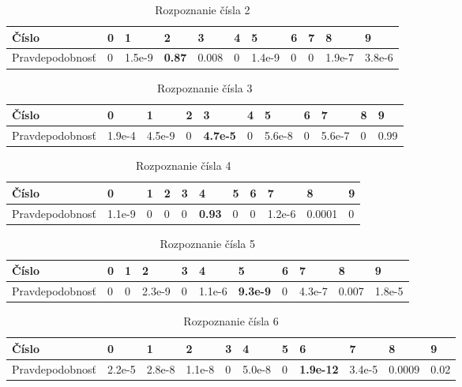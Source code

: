 \begin{table}[H]
  \begin{tabular}{ | l | l | l | l | l | l | l | l | l | l | l |}
    \hline
    Číslo & 0 & 1 & 2 & 3 & 4 & 5 & 6 & 7 & 8 & 9 \\ \hline
    Pravdepodobnosť & 0 & 1.5e-9 & \textbf{0.87} & 0.008 & 0 & 1.4e-9 & 0 & 0 & 1.9e-7 & 3.8e-6 \\
    \hline
  \end{tabular}
  \caption[Rozpoznanie čísla 2]{Rozpoznanie čísla 2}
\end{table}

\begin{table}[H]
  \begin{tabular}{ | l | l | l | l | l | l | l | l | l | l | l |}
    \hline
    Číslo & 0 & 1 & 2 & 3 & 4 & 5 & 6 & 7 & 8 & 9 \\ \hline
    Pravdepodobnosť & 1.9e-4 & 4.5e-9 & 0 & \textbf{4.7e-5} & 0 & 5.6e-8 & 0 & 5.6e-7 & 0 & 0.99 \\
    \hline
  \end{tabular}
  \caption[Rozpoznanie čísla 3]{Rozpoznanie čísla 3}
\end{table}

\begin{table}[H]
  \begin{tabular}{ | l | l | l | l | l | l | l | l | l | l | l |}
    \hline
    Číslo & 0 & 1 & 2 & 3 & 4 & 5 & 6 & 7 & 8 & 9 \\ \hline
    Pravdepodobnosť & 1.1e-9 & 0 & 0 & 0 & \textbf{0.93} & 0 & 0 & 1.2e-6 & 0.0001 & 0 \\
    \hline
  \end{tabular}
  \caption[Rozpoznanie čísla 4]{Rozpoznanie čísla 4}
\end{table}

\begin{table}[H]
  \begin{tabular}{ | l | l | l | l | l | l | l | l | l | l | l |}
    \hline
    Číslo & 0 & 1 & 2 & 3 & 4 & 5 & 6 & 7 & 8 & 9 \\ \hline
    Pravdepodobnosť & 0 & 0 & 2.3e-9 & 0 & 1.1e-6 & \textbf{9.3e-9} & 0 & 4.3e-7 & 0.007 & 1.8e-5 \\
    \hline
  \end{tabular}
  \caption[Rozpoznanie čísla 5]{Rozpoznanie čísla 5}
\end{table}

\begin{table}[H]
  \begin{tabular}{ | l | l | l | l | l | l | l | l | l | l | l |}
    \hline
    Číslo & 0 & 1 & 2 & 3 & 4 & 5 & 6 & 7 & 8 & 9 \\ \hline
    Pravdepodobnosť & 2.2e-5 & 2.8e-8 & 1.1e-8 & 0 & 5.0e-8 & 0 & \textbf{1.9e-12} & 3.4e-5 & 0.0009 & 0.02 \\
    \hline
  \end{tabular}
  \caption[Rozpoznanie čísla 6]{Rozpoznanie čísla 6}
\end{table}

